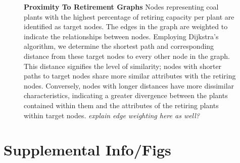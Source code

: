 \documentclass{article}
\begin{document}
\begin{figure}[H]
    \caption{\textbf{Proximity To Retirement Graphs} Nodes representing coal plants with the highest percentage of retiring capacity per plant are identified as target nodes. The edges in the graph are weighted to indicate the relationships between nodes. Employing Dijkstra's algorithm, we determine the shortest path and corresponding distance from these target nodes to every other node in the graph. This distance signifies the level of similarity; nodes with shorter paths to target nodes share more similar attributes with the retiring nodes. Conversely, nodes with longer distances have more dissimilar characteristics, indicating a greater divergence between the plants contained within them and the attributes of the retiring plants within target nodes. \textit{explain edge weighting here as well?}}
    \label{fig:3}
\end{figure}



\section{Supplemental Info/Figs}


%     
\end{document}
